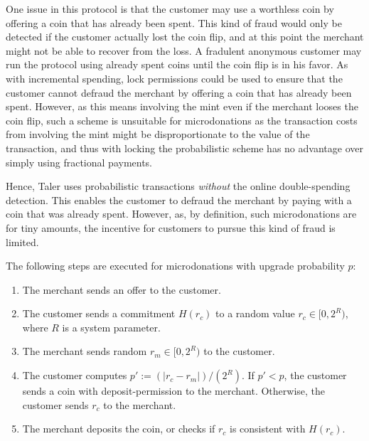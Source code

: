 \documentclass{llncs}
\begin{document}
One issue in this protocol is that the customer may use a worthless
coin by offering a coin that has already been spent.  This kind of
fraud would only be detected if the customer actually lost the coin
flip, and at this point the merchant might not be able to recover from
the loss.  A fradulent anonymous customer may run the protocol using
already spent coins until the coin flip is in his favor.  As with
incremental spending, lock permissions could be used to ensure that
the customer cannot defraud the merchant by offering a coin that has
already been spent.  However, as this means involving the mint even if
the merchant looses the coin flip, such a scheme is unsuitable for
microdonations as the transaction costs from involving the mint might
be disproportionate to the value of the transaction, and thus with
locking the probabilistic scheme has no advantage over simply using
fractional payments.

Hence, Taler uses probabilistic transactions {\em without} the online
double-spending detection.  This enables the customer to defraud the
merchant by paying with a coin that was already spent.  However, as,
by definition, such microdonations are for tiny amounts, the incentive
for customers to pursue this kind of fraud is limited.



The following steps are executed for microdonations with upgrade probability $p$:
\begin{enumerate}
  \item The merchant sends an offer to the customer.
  \item The customer sends a commitment $H(r_c)$ to a random
    value $r_c \in [0,2^R)$, where $R$ is a system parameter.
  \item The merchant sends random $r_m \in [0,2^R)$ to the customer.
    \item The customer computes $p' := (|r_c - r_m|) / (2^R)$.
    If $p' < p$, the customer sends a coin with deposit-permission to the merchant.
    Otherwise, the customer sends $r_c$ to the merchant.
  \item The merchant deposits the coin, or checks if $r_c$ is consistent
    with $H(r_c)$.
\end{enumerate}
\end{document}
